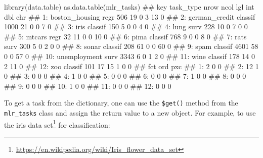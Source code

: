 \documentclass[12pt,]{scrbook}
\newenvironment{Shaded}{}{}
\newcommand{\KeywordTok}[1]{\textcolor[rgb]{0.00,0.00,1.00}{#1}}
\newcommand{\NormalTok}[1]{#1}
\newcommand{\OperatorTok}[1]{#1}
\newcommand{\StringTok}[1]{\textcolor[rgb]{0.00,0.50,0.50}{#1}}
\renewcommand{\href}[2]{#2\footnote{\url{#1}}}
\begin{document}
\begin{Shaded}
\begin{Highlighting}[]
\KeywordTok{library}\NormalTok{(data.table)}
\KeywordTok{as.data.table}\NormalTok{(mlr_tasks)}
\NormalTok{##                key task_type nrow ncol lgl int dbl chr}
\NormalTok{##  1: boston_housing      regr  506   19   0   3  13   0}
\NormalTok{##  2:  german_credit   classif 1000   21   0   0   7   0}
\NormalTok{##  3:           iris   classif  150    5   0   0   4   0}
\NormalTok{##  4:           lung      surv  228   10   0   7   0   0}
\NormalTok{##  5:         mtcars      regr   32   11   0   0  10   0}
\NormalTok{##  6:           pima   classif  768    9   0   0   8   0}
\NormalTok{##  7:           rats      surv  300    5   0   2   0   0}
\NormalTok{##  8:          sonar   classif  208   61   0   0  60   0}
\NormalTok{##  9:           spam   classif 4601   58   0   0  57   0}
\NormalTok{## 10:   unemployment      surv 3343    6   0   1   2   0}
\NormalTok{## 11:           wine   classif  178   14   0   2  11   0}
\NormalTok{## 12:            zoo   classif  101   17  15   1   0   0}
\NormalTok{##     fct ord pxc}
\NormalTok{##  1:   2   0   0}
\NormalTok{##  2:  12   1   0}
\NormalTok{##  3:   0   0   0}
\NormalTok{##  4:   1   0   0}
\NormalTok{##  5:   0   0   0}
\NormalTok{##  6:   0   0   0}
\NormalTok{##  7:   1   0   0}
\NormalTok{##  8:   0   0   0}
\NormalTok{##  9:   0   0   0}
\NormalTok{## 10:   1   0   0}
\NormalTok{## 11:   0   0   0}
\NormalTok{## 12:   0   0   0}
\end{Highlighting}
\end{Shaded}

To get a task from the dictionary, one can use the \texttt{\$get()} method from the \texttt{mlr\_tasks} class and assign the return value to a new object.
For example, to use the \href{https://en.wikipedia.org/wiki/Iris_flower_data_set}{iris data set} for classification:

\begin{Shaded}
\end{Shaded}
\end{document}
